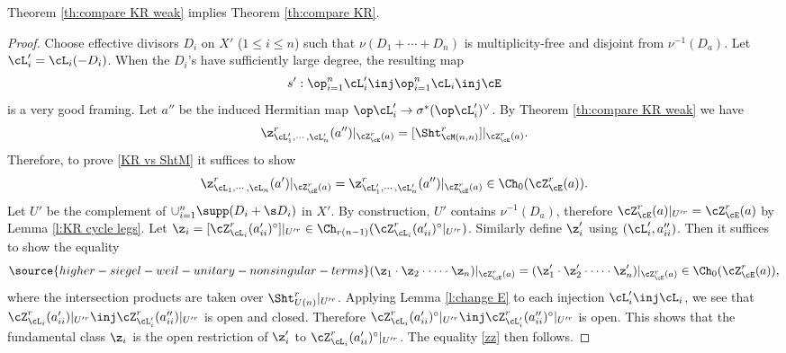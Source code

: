 \begin{lemma}
\notready\label{l:weak implies strong} Theorem \ref{th:compare KR weak} implies Theorem \ref{th:compare KR}.
\end{lemma}
\begin{proof} Choose effective divisors $D_{i}$ on $X'$ ($1\le i\le n$) such that $\nu(D_{1}+\cdots+D_{n})$ is multiplicity-free and disjoint from $\nu^{-1}(D_{a})$. Let $\cL'_{i}=\cL_{i}(-D_{i})$. When the $D_{i}$'s have sufficiently large degree,  the resulting map
\begin{equation}
s': \op_{i=1}^{n}\cL'_{i}\inj \op_{i=1}^{n}\cL_{i}\inj \cE
\end{equation}
is a very good framing. Let $a''$ be the induced Hermitian map $\op\cL'_{i} \rightarrow \sigma^* (\op\cL'_{i})^{\vee}$. By Theorem \ref{th:compare KR weak} we have
\begin{equation}
\z^{r}_{\cL'_{1},\cdots, \cL'_{n}}(a'')|_{\cZ^{r}_{\cE}(a)}=[\Sht^{r}_{\cM(n,n)}]|_{\cZ^{r}_{\cE}(a)}.
\end{equation}
Therefore, to prove \eqref{KR vs ShtM} it suffices to show
\begin{equation}
\z^{r}_{\cL_{1},\cdots, \cL_{n}}(a')|_{\cZ^{r}_{\cE}(a)}=\z^{r}_{\cL'_{1},\cdots, \cL'_{n}}(a'')|_{\cZ^{r}_{\cE}(a)}\in\Ch_{0}(\cZ^{r}_{\cE}(a)).
\end{equation}
Let $U'$ be the complement of $\cup_{i=1}^{n}\supp(D_{i}+\s D_{i})$ in $X'$. By construction, $U'$ contains $\nu^{-1}(D_{a})$, therefore $\cZ_{\cE}^{r}(a)|_{U'^{r}}=\cZ_{\cE}^{r}(a)$ by Lemma \ref{l:KR cycle legs}. Let $\z_{i}=[\cZ^{r}_{\cL_{i}}(a'_{ii})^{\circ}]|_{U'^{r}}\in \Ch_{r(n-1)}(\cZ^{r}_{\cL_{i}}(a'_{ii})^{\circ}|_{U'^{r}})$. Similarly define $\z'_{i}$ using $(\cL'_{i}, a''_{ii})$. Then it suffices to show the equality
\begin{equation}\label{zz}
\source{higher-siegel-weil-unitary-nonsingular-terms}
(\z_{1}\cdot \z_{2}\cdot \dots \cdot\z_{n})|_{\cZ^{r}_{\cE}(a)}=(\z'_{1}\cdot \z'_{2}\cdot \dots \cdot\z'_{n})|_{\cZ^{r}_{\cE}(a)}\in \Ch_{0}(\cZ^{r}_{\cE}(a)),
\end{equation}
where the intersection products are taken over $\Sht^{r}_{U(n)}|_{U'^{r}}$. Applying Lemma \ref{l:change E}  to each injection $\cL'_{i}\inj \cL_{i}$, we see that $\cZ^{r}_{\cL_{i}}(a'_{ii})|_{U'^{r}}\inj \cZ^{r}_{\cL'_{i}}(a''_{ii})|_{U'^{r}}$ is open and closed. Therefore $\cZ^{r}_{\cL_{i}}(a'_{ii})^{\circ}|_{U'^{r}}\inj \cZ^{r}_{\cL'_{i}}(a''_{ii})^{\circ}|_{U'^{r}}$ is open. This shows that the fundamental class $\z_{i}$ is the open restriction of $\z'_{i}$ to $\cZ^{r}_{\cL_{i}}(a'_{ii})^{\circ}|_{U'^{r}}$. The equality \eqref{zz} then follows.
\end{proof}




